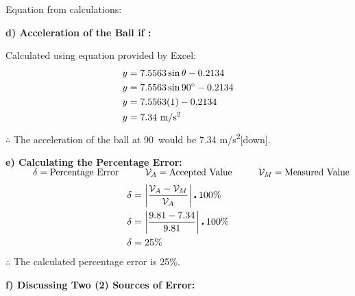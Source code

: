 \documentclass[12pt,letterpaper]{article}
\newcommand\tab[1][1cm]{\hspace*{#1}}
\begin{document}
\noindent
\tab Equation from calculations: \\
\vspace{-4mm}

\noindent
\textbf{\tab d) Acceleration of the Ball if \textdegree:}

\noindent
\tab Calculated using equation provided by Excel:
\vspace{-4mm}
\[
	\begin{aligned}
		y & =7.5563\sin \theta - 0.2134         \\
		y & =7.5563\sin 90\degree - 0.2134      \\
		y & =7.5563(1) - 0.2134                 \\
		y & =7.34~\text{m/s\textsuperscript{2}}
	\end{aligned}
	\vspace{-4mm}
\]
\noindent
\tab$\therefore$ The acceleration of the ball at 90\textdegree\ would be 7.34 m/s\textsuperscript{2}[down].

\vspace{4mm}
\noindent
\textbf{\tab e) Calculating the Percentage Error:}\\
\noindent
\tab $ \tab \delta = \text{Percentage Error} \tab \mathcal{V}_{A} = \text{Accepted Value} \tab \mathcal{V}_{M} = \text{Measured Value}$
\[
	\begin{aligned}
		\delta & = \left\lvert \frac{ \mathcal{V}_{A} - \mathcal{V}_{M} }{\mathcal{V}_{A}} \right\rvert \centerdot 100\% \\
		\delta & = \left\lvert \frac{9.81-7.34}{9.81}\right\rvert \centerdot 100\%                                       \\
		\delta & = 25\%
	\end{aligned}
	\vspace{-4mm}
\]
\noindent
\tab $\therefore$ The calculated percentage error is 25\%.

\newpage

\noindent
\textbf{\tab f) Discussing Two (2) Sources of Error:}
\end{document}
